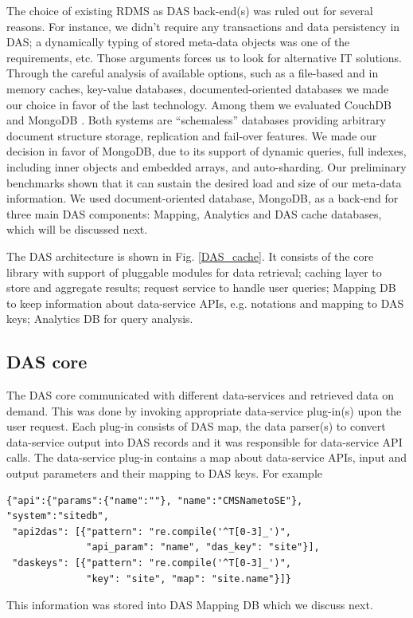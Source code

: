 \documentclass[1p,times]{elsarticle}
\begin{document}
\noindent
The choice of existing RDMS as DAS back-end(s) was ruled out for several reasons. 
For instance, we didn't require any transactions and data persistency in DAS;
a dynamically typing of stored meta-data objects was one of the requirements, etc.
Those arguments forces us to look for alternative IT solutions.
Through the careful analysis of available options, such as a file-based and in memory caches, 
key-value databases, documented-oriented databases we made our choice in favor 
of the last technology. Among them we evaluated CouchDB \cite{CouchDB} and 
MongoDB \cite{MongoDB}. Both systems are ``schemaless'' databases providing
arbitrary document structure storage, replication and fail-over features. 
We made our decision in favor of MongoDB, due to its support of dynamic queries, 
full indexes, including inner objects and embedded arrays,
and auto-sharding. Our preliminary benchmarks shown that it can sustain
the desired load and size of our meta-data information. We used 
document-oriented database, MongoDB, as a back-end for three 
main DAS components: Mapping, Analytics and DAS cache databases, 
which will be discussed next. 

The DAS architecture is shown in Fig. \ref{DAS_cache}. It consists of
the core library with support of pluggable modules for data retrieval;
caching layer to store and aggregate results;
request service to handle user queries;
Mapping DB to keep information about data-service APIs, e.g.
notations and mapping to DAS keys;
Analytics DB for query analysis.

\subsection{DAS core}
The DAS core communicated with different data-services and retrieved
data on demand. This was done by invoking appropriate data-service plug-in(s)
upon the user request. Each plug-in consists of DAS map, the
data parser(s) to convert data-service output into DAS records
and it was responsible for data-service API calls.
The data-service plug-in contains a map about data-service APIs,
input and output parameters and their mapping to DAS keys. For example
\begin{verbatim}
{"api":{"params":{"name":""}, "name":"CMSNametoSE"}, "system":"sitedb",
 "api2das": [{"pattern": "re.compile('^T[0-3]_')", 
              "api_param": "name", "das_key": "site"}], 
 "daskeys": [{"pattern": "re.compile('^T[0-3]_')", 
              "key": "site", "map": "site.name"}]}
\end{verbatim}
This information was stored into DAS Mapping DB which we discuss next.
\end{document}
